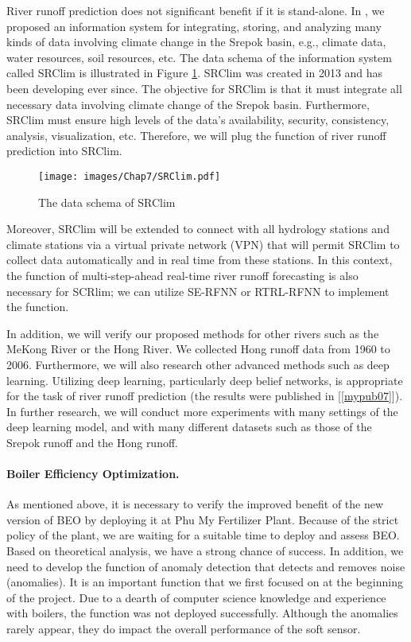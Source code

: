 {River runoff prediction does not significant benefit if it is stand-alone. In \cite{swatref01}, we proposed an information system for integrating, storing, and analyzing many kinds of data involving climate change in the Srepok basin, e.g., climate data, water resources, soil resources, etc. The data schema of the information system called SRClim is illustrated in Figure \ref{chap07:fig01}. SRClim was created in 2013 and has been developing ever since. The objective for SRClim is that it must integrate all necessary data involving climate change of the Srepok basin. Furthermore, SRClim must ensure high levels of the data's availability, security, consistency, analysis, visualization, etc. Therefore, we will plug the function of river runoff prediction into SRClim. 

\begin{figure}[H]
  \centering
  \texttt{[image: images/Chap7/SRClim.pdf]}
  \caption{The data schema of SRClim}
  \label{chap07:fig01}    
\end{figure}

Moreover, SRClim will be extended to connect with all hydrology stations and climate stations via a virtual private network (VPN) that will permit SRClim to collect data automatically and in real time from these stations. In this context, the function of multi-step-ahead real-time river runoff forecasting is also necessary for SCRlim; we can utilize SE-RFNN or RTRL-RFNN to implement the function.

In addition, we will verify our proposed methods for other rivers such as the MeKong River or the Hong River. We collected Hong runoff data from 1960 to 2006. Furthermore, we will also research other advanced methods such as deep learning. Utilizing deep learning, particularly deep belief networks, is appropriate for the task of river runoff prediction (the results were published in [\ref{mypub07}]). In further research, we will conduct more experiments with many settings of the deep learning model, and with many different datasets such as those of the Srepok runoff and the Hong runoff.

\paragraph{Boiler Efficiency Optimization.}

As mentioned above, it is necessary to verify the improved benefit of the new version of BEO by deploying it at Phu My Fertilizer Plant. Because of the strict policy of the plant, we are waiting for a suitable time to deploy and assess BEO. Based on theoretical analysis, we have a strong chance of success. In addition, we need to develop the function of anomaly detection that detects and removes noise (anomalies). It is an important function that we first focused on at the beginning of the project. Due to a dearth of computer science knowledge and experience with boilers, the function was not deployed successfully. Although the anomalies rarely appear, they do impact the overall performance of the soft sensor.  

}
